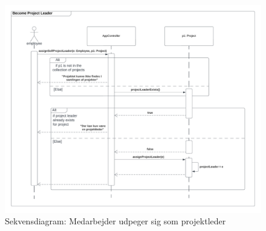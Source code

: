 \begin{figure}[H]
    \centering
    \caption{Sekvensdiagram: Medarbejder udpeger sig som projektleder}\label{fig:becomeProjectLeader}
    \includegraphics[width = 1\textwidth]{Diagrams/Become Project Leader.png}
\end{figure}